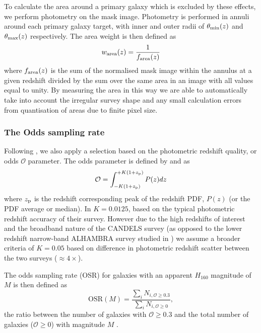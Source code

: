 To calculate the area around a primary galaxy which is excluded by these effects, we perform photometry on the mask image.  Photometry is performed in annuli around each primary galaxy target, with inner and outer radii of $\theta_{\rm{min}}(z)$ and $\theta_{\rm{max}}(z)$ respectively. The area weight is then defined as
\begin{equation}
	w_{\rm{area}}(z) = \frac{1} {f_{	\rm{area}}(z)}
\end{equation}
where $f_{	\rm{area}}(z)$ is the sum of the normalised mask image within the annulus at a given redshift divided by the sum over the same area in an image with all values equal to unity. By measuring the area in this way we are able to automatically take into account the irregular survey shape and any small calculation errors from quantisation of areas due to finite pixel size.

\subsubsection{The Odds sampling rate}\label{sec:weights_osr}
Following , we also apply a selection based on the photometric redshift quality, or odds $\mathcal{O}$ parameter. The odds parameter is defined by \citet{Benitez:2000jr} and \citet{Molino:2014iz} as
\begin{equation}
	\mathcal{O} = \int_{-K(1+z_{\rm{p}})}^{+K(1+z_{\rm{p}})} P(z) dz
\end{equation}
where $z_{\rm{p}}$ is the redshift corresponding peak of the redshift PDF, $P(z)$ (or the PDF average or median). In \citet{Molino:2014iz} $K = 0.0125$, based on the typical photometric redshift accuracy of their survey. However due to the high redshifts of interest and the broadband nature of the CANDELS survey (as opposed to the lower redshift narrow-band ALHAMBRA survey studied in \citet{Molino:2014iz}) we assume a broader criteria of $K = 0.05$ based on difference in photometric redshift scatter between the two surveys ($\approx 4\times$).

The odds sampling rate (OSR) for galaxies with an apparent $H_{160}$ magnitude of $M$ is then defined as
\begin{equation}
	\text{OSR}(M) = \frac{\sum_{i} N_{i, \mathcal{O} \geq 0.3}} {\sum_{i} N_{i, \mathcal{O} \geq 0} },
\end{equation}
the ratio between the number of galaxies with $\mathcal{O} \geq 0.3$  and the total number of galaxies ($\mathcal{O} \geq 0$) with magnitude $M$ \citep{Molino:2014iz}.

